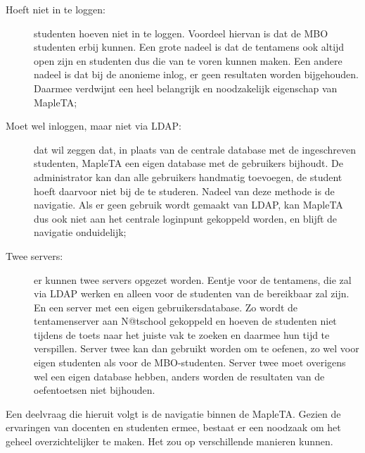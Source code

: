 \begin{description}
\item[Hoeft niet in te loggen:] studenten hoeven niet in te
  loggen. Voordeel hiervan is dat de MBO studenten erbij kunnen. Een
  grote nadeel is dat de tentamens ook altijd open zijn en studenten
  dus die van te voren kunnen maken. Een andere nadeel is dat bij de
  anonieme inlog, er geen resultaten worden bijgehouden. Daarmee
  verdwijnt een heel belangrijk en noodzakelijk eigenschap van
  MapleTA;
\item[Moet wel inloggen, maar niet via LDAP:] dat wil zeggen dat, in
  plaats van de centrale database met de ingeschreven studenten,
  MapleTA een eigen database met de gebruikers bijhoudt. De
  administrator kan dan alle gebruikers handmatig toevoegen, de
  student hoeft daarvoor niet bij de \HR{} te studeren. Nadeel van deze
  methode is de navigatie. Als er geen gebruik wordt gemaakt van LDAP,
  kan MapleTA dus ook niet aan het centrale loginpunt gekoppeld
  worden, en blijft de navigatie onduidelijk;
\item[Twee servers:] er kunnen twee servers opgezet worden. Eentje
  voor de tentamens, die zal via LDAP werken en alleen voor de
  studenten van de \HR{} bereikbaar zal zijn. En een server met een
  eigen gebruikersdatabase. Zo wordt de tentamenserver aan N@tschool
  gekoppeld en hoeven de studenten niet tijdens de toets naar het
  juiste vak te zoeken en daarmee hun tijd te verspillen. Server twee
  kan dan gebruikt worden om te oefenen, zo wel voor eigen studenten
  als voor de MBO-studenten. Server twee moet overigens wel een eigen
  database hebben, anders worden de resultaten van de oefentoetsen
  niet bijhouden.
\end{description}


Een deelvraag die hieruit volgt is de navigatie binnen de
MapleTA. Gezien de ervaringen van docenten en studenten ermee, bestaat
er een noodzaak om het geheel overzichtelijker te maken. Het zou op
verschillende manieren kunnen.

